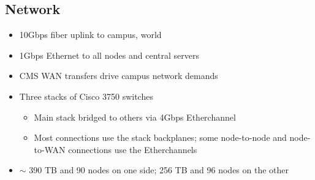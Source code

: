 \documentclass{beamer}
\newcommand{\ca}{\ensuremath{\sim}}
\begin{document}
\subsection{Network}
\begin{frame}
\begin{itemize}
	\item 10Gbps fiber uplink to campus, world
	\item 1Gbps Ethernet to all nodes and central servers
	\item CMS WAN transfers drive campus network demands
	\item Three stacks of Cisco 3750 switches
	\begin{itemize}
		\item Main stack bridged to others via 4Gbps Etherchannel
		\item Most connections use the stack backplanes; some node-to-node and node-to-WAN connections use the Etherchannels
	\end{itemize}
	\item \ca{} 390 TB and 90 nodes on one side; 256 TB and 96 nodes on the other
\end{itemize}
\end{frame}
\end{document}
